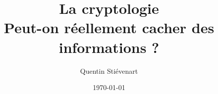 \documentclass{beamer}
\title{La cryptologie\\
Peut-on réellement cacher des informations ?}
\author{Quentin Stiévenart}
\date{\today}
\begin{document}
\frame{\titlepage}

\section[Présentation]{}
\frame{\tableofcontents}
\end{document}
